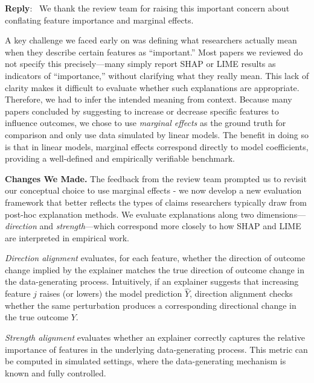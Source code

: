 \documentclass[11pt]{article}
\newcounter{se}[section]
\newenvironment{reply}
 {\par\medskip \noindent \begin{sf}\textbf{Reply}:\ }
 {\medskip \end{sf}}
\begin{document}
\begin{reply}
We thank the review team for raising this important concern about conflating feature importance and marginal effects. 


A key challenge we faced early on was defining what researchers actually mean when they describe certain features as “important.” Most papers we reviewed do not specify this precisely—many simply report SHAP or LIME results as indicators of “importance,” without clarifying what they really mean. This lack of clarity makes it difficult to evaluate whether such explanations are appropriate. Therefore, we had to infer the intended meaning from context. Because many papers concluded by suggesting to increase or decrease specific features to influence outcomes, we chose to use \textit{marginal effects} as the ground truth for comparison and only use data simulated by linear models. The benefit in doing so is that in linear models, marginal effects correspond directly to model coefficients, providing a well-defined and empirically verifiable benchmark. 








\noindent\textbf{Changes We Made.}
The feedback from the review team prompted us to revisit our conceptual choice to use marginal effects - we now develop a new evaluation framework that better reflects the types of claims researchers typically draw from post-hoc explanation methods. We evaluate explanations along two dimensions—\emph{direction} and \emph{strength}—which correspond more closely to how SHAP and LIME are interpreted in empirical work.

\emph{Direction alignment} evaluates, for each feature, whether the direction of outcome change implied by the explainer matches the true direction of outcome change in the data-generating process. Intuitively, if an explainer suggests that increasing feature $j$ raises (or lowers) the model prediction $\hat{Y}$, direction alignment checks whether the same perturbation produces a corresponding directional change in the true outcome $Y$.

\emph{Strength alignment} evaluates whether an explainer correctly captures the relative importance of features in the underlying data-generating process. This metric can be computed in simulated settings, where the data-generating mechanism is known and fully controlled. 



\end{reply}
\end{document}
